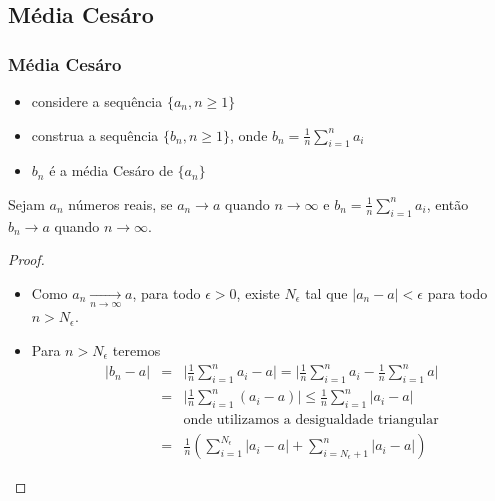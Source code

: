 \begin{frame}[allowframebreaks]
\end{frame}


\subsection{Média Cesáro}
\begin{frame}[allowframebreaks]
  \frametitle{Média Cesáro}
  \begin{itemize}
  \item considere a sequência $\{a_n , n \geq 1 \}$
  \item construa a sequência $\{b_n , n \geq 1 \}$, onde $b_n = \frac{1}{n} \sum_{i=1}^n a_i$
  \item $b_n$ é a média Cesáro de $\{a_n\}$
  \end{itemize}

  \begin{lemma}
  Sejam $a_n$ números reais, se $a_n \rightarrow a$ quando $n \rightarrow \infty$ e $b_n = \frac{1}{n} \sum_{i=1}^n a_i$,
  então $b_n \rightarrow a$ quando $n \rightarrow \infty$.
  \end{lemma}  

  \framebreak

  \begin{proof}
  \begin{itemize}
  \item Como $a_n \xrightarrow[ n \rightarrow \infty ]{ } a$, para todo $\epsilon > 0$, existe $N_{\epsilon}$ tal que $\vert a_n - a \vert < \epsilon$
	para todo $n > N_{\epsilon}$.
  \end{itemize}
  \proofbreak
  \begin{itemize}
  \item Para $n > N_{\epsilon}$ teremos
	\begin{eqnarray}
	\vert b_n - a \vert &=& \vert \frac{1}{n} \sum_{i=1}^n a_i - a \vert = \vert \frac{1}{n} \sum_{i=1}^n a_i - \frac{1}{n} \sum_{i=1}^n a \vert \nonumber \\
			&=& \vert \frac{1}{n} \sum_{i=1}^n (a_i - a) \vert  \leq  \frac{1}{n} \sum_{i=1}^n \vert a_i - a \vert \nonumber \\
			&& \text{onde utilizamos a desigualdade triangular} \nonumber \\
			&=& \frac{1}{n} \left( \sum_{i=1}^{N_{\epsilon}} \vert a_i - a \vert + \sum_{i=N_{\epsilon}+1}^n \vert a_i - a \vert \right)
	\end{eqnarray}
  \end{itemize}

  \proofbreak 


\end{proof}
\end{frame}
